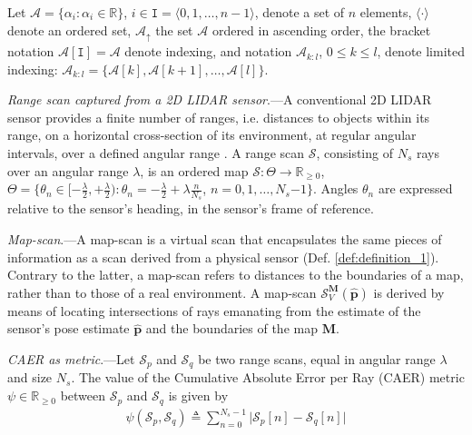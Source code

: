 Let $\mathcal{A} = \{\alpha_i: \alpha_i \in \mathbb{R}\}$,
$i \in \texttt{I} = \langle 0,1,\dots,n-1 \rangle$, denote a set of $n$ elements,
$\langle\cdot\rangle$ denote an ordered set, $\mathcal{A}_{\uparrow}$ the
set $\mathcal{A}$ ordered in ascending order, the bracket notation
$\mathcal{A}[\texttt{I}] = \mathcal{A}$ denote indexing, and notation
$\mathcal{A}_{k:l}$, $0 \leq k \leq l$, denote limited indexing:
$\mathcal{A}_{k:l}= \{\mathcal{A}[k], \mathcal{A}[k+1], \dots, \mathcal{A}[l]\}$.

\begin{definition}
  \label{def:definition_1} \textit{Range scan captured from a 2D LIDAR
  sensor}.---A conventional 2D LIDAR sensor provides a finite number of
  ranges, i.e. distances to objects within its range, on a horizontal
  cross-section of its environment, at regular angular intervals,
  over a defined angular range \cite{Cooper2018c}. A range scan $\mathcal{S}$,
  consisting of $N_s$ rays over an angular range $\lambda$, is an ordered map
  $\mathcal{S} : \Theta \rightarrow \mathbb{R}_{\geq 0}$,
  $\Theta = \{\theta_n \in [-\frac{\lambda}{2}, +\frac{\lambda}{2}) : \theta_n = -\frac{\lambda}{2}
  + \lambda \frac{n}{N_s}$, $n = 0,1,\dots, N_s$$-$$1$$\}$. Angles $\theta_n$
  are expressed relative to the sensor's heading, in the sensor's frame of
  reference.
\end{definition}

\begin{definition}
  \label{def:definition_2} \textit{Map-scan}.---A map-scan is a virtual scan
  that encapsulates the same pieces of information as a scan derived from a
  physical sensor (Def. \ref{def:definition_1}). Contrary to the latter, a
  map-scan refers to distances to the boundaries of a map, rather than to those
  of a real environment. A map-scan $\mathcal{S}_V^{\bm{M}}(\hat{\bm{p}})$ is
  derived by means of locating intersections of rays emanating from the
  estimate of the sensor's pose estimate $\hat{\bm{p}}$ and the boundaries of
  the map $\bm{M}$.
\end{definition}

\begin{definition}
  \label{def:definition_3} \textit{CAER as metric}.---Let
  $\mathcal{S}_p$ and $\mathcal{S}_q$ be two range scans, equal in angular
  range $\lambda$ and size $N_s$. The value of the Cumulative Absolute Error
  per Ray (CAER) metric $\psi \in \mathbb{R}_{\geq 0}$ between $\mathcal{S}_p$
  and $\mathcal{S}_q$ is given by
  \begin{align}
    \psi(\mathcal{S}_p,\mathcal{S}_q) \triangleq \sum\limits_{n=0}^{N_s-1} \Big| \mathcal{S}_p[n]-\mathcal{S}_q[n]\Big| \label{eq:caer}
  \end{align}
\end{definition}

